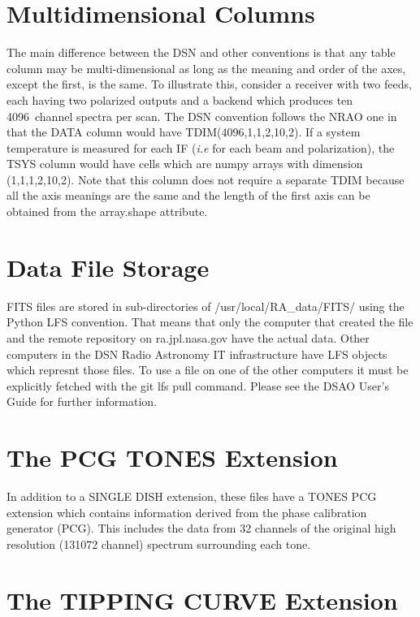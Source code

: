 \documentclass[letterpaper,11pt]{book}
\begin{document}
\section{Multidimensional Columns}

The main difference between the DSN and other conventions is that any table 
column may be multi-dimensional as long as the meaning and order of the axes,
except the first, is the same.  To illustrate this, consider a receiver with
two feeds, each having two polarized outputs and a backend which produces ten
4096~channel spectra per scan.  The DSN convention follows the NRAO one in that
the DATA column would have {\ttfamily TDIM(4096,1,1,2,10,2)}.  If a system 
temperature is measured for each IF ({\itshape i.e} for each beam and
polarization), the {\ttfamily TSYS} column 
would have cells which are numpy arrays with dimension 
{\ttfamily (1,1,1,2,10,2)}. Note that this column does 
not require a separate {\ttfamily TDIM} because all the axis
meanings are the same and the length of the first axis can be obtained from
the {\ttfamily array.shape} attribute.

\section{Data File Storage}

FITS files are stored in sub-directories of {\ttfamily /usr/local/RA\_data/FITS/}
using the Python LFS convention. That means that only the computer that created
the file and the remote repository on ra.jpl.nasa.gov have the actual data.
Other computers in the DSN Radio Astronomy IT infrastructure have LFS objects
which represnt those files.  To use a file on one of the other computers it 
must be explicitly fetched with the {\ttfamily git lfs pull} command.  Please
see the DSAO User's Guide for further information.

\section{The PCG TONES Extension}

In addition to a
SINGLE DISH extension, these files have a TONES PCG extension which contains
information derived from the phase calibration generator (PCG). This includes
the data from 32 channels of the original high resolution (131072 channel)
spectrum surrounding each tone.

\section{The TIPPING CURVE Extension}
\end{document}
